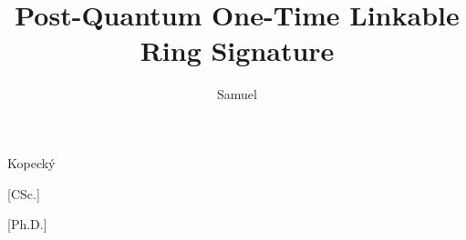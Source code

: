
\usepackage[
  english,			%
	semestral,		%
  center,			%
]{thesis}   %


\author[Bc.]{Samuel}{Kopecký}


[CSc.]

[Ph.D.]

\title{Post-Quantum One-Time Linkable Ring Signature}


